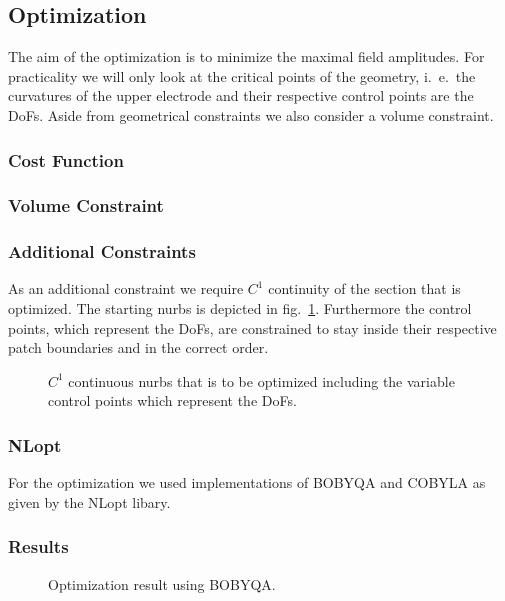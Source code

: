 \subsection{Optimization}
The aim of the optimization is to minimize the maximal field amplitudes. For practicality we will only look at the critical points of the geometry, i.~e.~the curvatures of the upper electrode and their respective control points are the DoFs. Aside from geometrical constraints we also consider a volume constraint.

\subsubsection{Cost Function}

\subsubsection{Volume Constraint}

\subsubsection{Additional Constraints}
As an additional constraint we require $C^1$ continuity of the section that is optimized. The starting nurbs is depicted in fig.~\ref{fig:nurbs}. Furthermore the control points, which represent the DoFs, are constrained to stay inside their respective patch boundaries and in the correct order.

\begin{center}
\begin{figure}[H]
   \caption{$C^1$ continuous nurbs that is to be optimized including the variable control points which represent the DoFs.}
   \label{fig:nurbs}
\end{figure}
\end{center}

\subsubsection{NLopt}
For the optimization we used implementations of BOBYQA and COBYLA as given by the NLopt libary.

\subsubsection{Results}

\begin{center}
\begin{figure}[H]
   \caption{Optimization result using BOBYQA.}
   \label{fig:results}
\end{figure}
\end{center}

